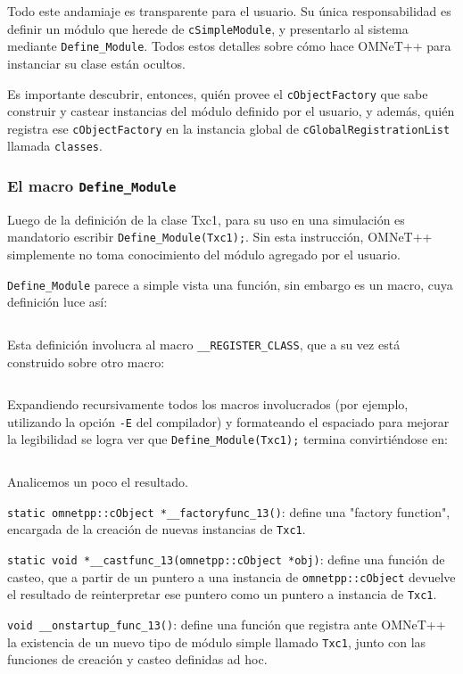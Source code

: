 \documentclass[]{article}
\begin{document}
Todo este andamiaje es transparente para el usuario. Su única responsabilidad
es definir un módulo que herede de \verb!cSimpleModule!, y presentarlo al
sistema mediante \verb!Define_Module!. Todos estos detalles sobre cómo hace
OMNeT++ para instanciar su clase están ocultos.

Es importante descubrir, entonces, quién provee el \verb!cObjectFactory! que
sabe construir y castear instancias del módulo definido por el usuario, y
además, quién registra ese \verb!cObjectFactory! en la instancia global de
\verb!cGlobalRegistrationList! llamada \verb!classes!.

\subsubsection{El macro \texttt{Define\_Module}}

Luego de la definición de la clase Txc1, para su uso en una simulación es
mandatorio escribir \verb!Define_Module(Txc1);!. Sin esta instrucción, OMNeT++
simplemente no toma conocimiento del módulo agregado por el usuario.

\verb!Define_Module! parece a simple vista una función, sin embargo es un
macro, cuya definición luce así:

\inputminted{c++}{codelistings/define_module_1.cc}

Esta definición involucra al macro \verb!__REGISTER_CLASS!, que a su vez está
construido sobre otro macro:

\inputminted{c++}{codelistings/define_module_2.cc}

Expandiendo recursivamente todos los macros involucrados (por ejemplo,
utilizando la opción \verb!-E! del compilador) y formateando el espaciado para
mejorar la legibilidad se logra ver que \verb!Define_Module(Txc1);! termina
convirtiéndose en:

\inputminted{c++}{codelistings/define_module_3.cc}

Analicemos un poco el resultado.

\verb!static omnetpp::cObject *__factoryfunc_13()!: define una "factory
function", encargada de la creación de nuevas instancias de \verb!Txc1!.

\verb!static void *__castfunc_13(omnetpp::cObject *obj)!: define una función de
casteo, que a partir de un puntero a una instancia de \verb!omnetpp::cObject!
devuelve el resultado de reinterpretar ese puntero como un puntero a instancia
de \verb!Txc1!.

\verb!void __onstartup_func_13()!: define una función que registra ante OMNeT++
la existencia de un nuevo tipo de módulo simple llamado \verb!Txc1!, junto con
las funciones de creación y casteo definidas ad hoc.
\end{document}
